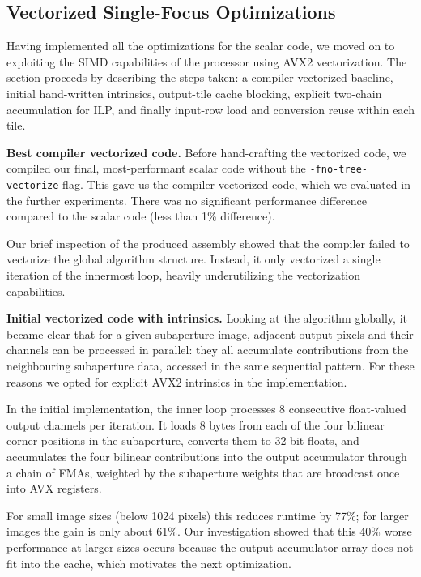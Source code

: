 \documentclass[letterpaper]{article}
\newcommand{\mypar}[1]{{\bf #1.}}
\begin{document}
\subsection{Vectorized Single-Focus Optimizations}\label{subsec:vectorized-single-focus}
Having implemented all the optimizations for the scalar code, we moved on to exploiting the SIMD capabilities of the processor using AVX2 vectorization. The section proceeds by describing the steps taken: a compiler-vectorized baseline, initial hand-written intrinsics, output-tile cache blocking, explicit two-chain accumulation for ILP, and finally input-row load and conversion reuse within each tile.
 

\mypar{Best compiler vectorized code} Before hand-crafting the vectorized code, we compiled our final, most-performant scalar code without the \texttt{-fno-tree-vectorize} flag. This gave us the compiler-vectorized code, which we evaluated in the further experiments. There was no significant performance difference compared to the scalar code (less than 1\% difference).

Our brief inspection of the produced assembly showed that the compiler failed to vectorize the global algorithm structure. Instead, it only vectorized a single iteration of the innermost loop, heavily underutilizing the vectorization capabilities.

\mypar{Initial vectorized code with intrinsics}
Looking at the algorithm globally, it became clear that for a given subaperture image, adjacent output pixels and their channels can be processed in parallel: they all accumulate contributions from the neighbouring subaperture data, accessed in the same sequential pattern. For these reasons we opted for explicit AVX2 intrinsics in the implementation.

In the initial implementation, the inner loop processes 8 consecutive float-valued output channels per iteration. It loads 8 bytes from each of the four bilinear corner positions in the subaperture, converts them to 32-bit floats, and accumulates the four bilinear contributions into the output accumulator through a chain of FMAs, weighted by the subaperture weights that are broadcast once into AVX registers. 

For small image sizes (below 1024 pixels) this reduces runtime by 77\%; for larger images the gain is only about 61\%. Our investigation showed that this 40\% worse performance at larger sizes occurs because the output accumulator array does not fit into the cache, which motivates the next optimization.
\end{document}
